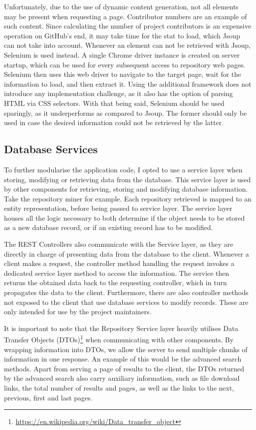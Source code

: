 Unfortunately, due to the use of dynamic content generation, not all elements may be present when requesting a page.
Contributor numbers are an example of such content.
Since calculating the number of project contributors is an expensive operation on GitHub's end, it may take time for the stat to load, which Jsoup can not take into account.
Whenever an element can not be retrieved with Jsoup, Selenium is used instead.
A single Chrome driver instance is created on server startup, which can be used for every subsequent access to repository web pages.
Selenium then uses this web driver to navigate to the target page, wait for the information to load, and then extract it.
Using the additional framework does not introduce any implementation challenge, as it also has the option of parsing HTML via CSS selectors.
With that being said, Selenium should be used sparingly, as it underperforms as compared to Jsoup.
The former should only be used in case the desired information could not be retrieved by the latter.

\subsection{Database Services}

To further modularise the application code, I opted to use a service layer when storing, modifying or retrieving data from the database.
This service layer is used by other components for retrieving, storing and modifying database information.
Take the repository miner for example.
Each repository retrieved is mapped to an entity representation, before being passed to service layer.
The service layer houses all the logic necessary to both determine if the object needs to be stored as a new database record, or if an existing record has to be modified.

The REST Controllers also communicate with the Service layer, as they are directly in charge of presenting data from the database to the client.
Whenever a client makes a request, the controller method handling the request invokes a dedicated service layer method to access the information.
The service then returns the obtained data back to the requesting controller, which in turn propagates the data to the client.
Furthermore, there are also controller methods not exposed to the client that use database services to modify records.
These are only intended for use by the project maintainers.

It is important to note that the Repository Service layer heavily utilises Data Transfer Objects (DTOs)\footnote{\url{https://en.wikipedia.org/wiki/Data_transfer_object}} when communicating with other components.
By wrapping information into DTOs, we allow the server to send multiple chunks of information in one response.
An example of this would be the advanced search methods.
Apart from serving a page of results to the client, the DTOs returned by the advanced search also carry auxiliary information, such as file download links, the total number of results and pages, as well as the links to the next, previous, first and last pages.

